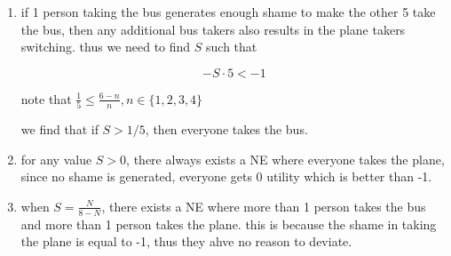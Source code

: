 \documentclass{article}
\begin{document}
\begin{enumerate}
    \item if 1 person taking the bus generates enough shame to make the other 5 take the bus, then any additional bus takers also results in the plane takers switching. thus we need to find \(S\) such that
    
    \begin{equation}
        -S\cdot5< -1
    \end{equation}
    
    note that \(\frac{1}{5}\leq \frac{6-n}{n},n\in\{1,2,3,4\}\)
    
    we find that if \(S>1/5\), then everyone takes the bus. 




    \item for any value \(S>0\), there always exists a NE where everyone takes the plane, since no shame is generated, everyone gets 0 utility which is better than -1.

    \item when \(S=\frac{N}{8-N}\), there exists a NE where more than 1 person takes the bus and more than 1 person takes the plane. this is because the shame in taking the plane is equal to -1, thus they ahve no reason to deviate. 





\end{enumerate}
\end{document}
